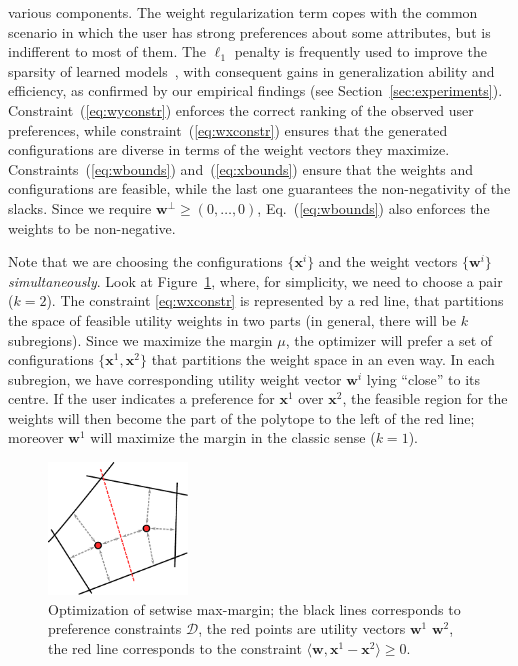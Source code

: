 \documentclass{article}
\renewcommand\[{\begin{equation}}
\renewcommand\]{\end{equation}}
\newcommand{\calvar}[1]{\ensuremath{\mathcal{#1}}}
\newcommand{\calD}{\calvar{D}}
\newcommand{\vecvar}[1]{\ensuremath{\boldsymbol{#1}}}
\newcommand{\vw}{\vecvar{w}}
\newcommand{\vx}{\vecvar{x}}
\newcommand{\stefano}[1]{{\bf \textcolor{green}{{\fbox{Stefano:} #1}}}}
\newcommand{\paolo}[1]{{\bf \textcolor{red}{{\fbox{Paolo:} #1}}}}
\begin{document}
various components. The weight regularization term copes with the
common scenario in which the user has strong preferences about some
attributes, but is indifferent to most of
them. %
The $\ell_1$ penalty is frequently used to improve the sparsity of
learned models~\cite{lasso,zhang2008,Hensinger2010}, with consequent
gains in generalization ability and efficiency, as confirmed by our
empirical findings (see
Section~\ref{sec:experiments}). Constraint~(\ref{eq:wyconstr})
enforces the correct ranking of the observed user preferences, while
constraint~(\ref{eq:wxconstr}) ensures that the generated
configurations are diverse in terms of the weight vectors they
maximize. Constraints~(\ref{eq:wbounds}) and~(\ref{eq:xbounds}) ensure
that the weights and configurations are feasible, while the last one
guarantees the non-negativity of the slacks.  Since we require
$\vw^\bot \ge (0,\ldots,0)$, Eq.~(\ref{eq:wbounds}) also enforces the
weights to be non-negative.

Note that we are choosing the configurations $\{ \vx^i \}$ and the
weight vectors $\{ \vw^i \}$ {\em simultaneously}.  Look at
Figure~\ref{fig:setmargin}, where, for simplicity, we need to choose a
pair ($k=2$).  The constraint \ref{eq:wxconstr} is represented by a
red line, that partitions the space of feasible utility weights in two
parts (in general, there will be $k$ subregions).  Since we maximize
the margin $\mu$, the optimizer will prefer a set of configurations
$\{ \vx^{1}, \vx^{2} \}$ that partitions the weight space in an even
way.  In each subregion, we have corresponding utility weight vector
$\vw^{i}$ lying ``close'' to its centre. If the user indicates a
preference for $\vx^{1}$ over $\vx^{2}$, the feasible region for the
weights will then become the part of the polytope to the left of the
red line; moreover $\vw^{1}$ will maximize the margin in the classic
sense ($k=1$).

\begin{figure}[t]
    \begin{center}
        \includegraphics[width=10em]{figures/setmargin}
    \end{center}
    \caption{\label{fig:setmargin} Optimization of setwise max-margin; the black lines corresponds to preference constraints $\calD$, the red points are utility vectors $\vw^{1}$ $\vw^{2}$, the red line corresponds to the constraint $\langle \vw, \vx^{1} - \vx^{2} \rangle \ge 0$.}
\end{figure}
\end{document}
